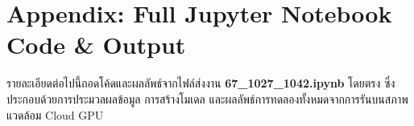 \documentclass[12pt,a4paper]{article}
\newcommand{\codevar}[1]{\textcolor{codeaccent}{\textbf{#1}}}
\begin{document}
\clearpage
\appendix
\raggedbottom
\section*{Appendix: Full Jupyter Notebook Code \& Output}

รายละเอียดต่อไปนี้ถอดโค้ดและผลลัพธ์จากไฟล์ส่งงาน \codevar{67\_1027\_1042.ipynb} โดยตรง ซึ่งประกอบด้วยการประมวลผลข้อมูล การสร้างโมเดล และผลลัพธ์การทดลองทั้งหมดจากการรันบนสภาพแวดล้อม Cloud GPU


\end{document}
